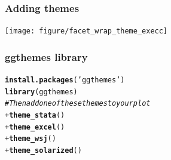 \documentclass{beamer}\usepackage[]{graphicx}\usepackage[]{color}
\makeatletter
\newcommand{\hlstr}[1]{\textcolor[rgb]{0.192,0.494,0.8}{#1}}%
\newcommand{\hlcom}[1]{\textcolor[rgb]{0.678,0.584,0.686}{\textit{#1}}}%
\newcommand{\hlopt}[1]{\textcolor[rgb]{0,0,0}{#1}}%
\newcommand{\hlstd}[1]{\textcolor[rgb]{0.345,0.345,0.345}{#1}}%
\newcommand{\hlkwd}[1]{\textcolor[rgb]{0.737,0.353,0.396}{\textbf{#1}}}%
\newenvironment{kframe}{%
 \def\at@end@of@kframe{}%
 \ifinner\ifhmode%
  \def\at@end@of@kframe{\end{minipage}}%
  \begin{minipage}{\columnwidth}%
 \fi\fi%
 \def\FrameCommand##1{\hskip\@totalleftmargin \hskip-\fboxsep
 \colorbox{shadecolor}{##1}\hskip-\fboxsep
     \hskip-\linewidth \hskip-\@totalleftmargin \hskip\columnwidth}%
 \MakeFramed {\advance\hsize-\width
   \@totalleftmargin\z@ \linewidth\hsize
   \@setminipage}}%
 {\par\unskip\endMakeFramed%
 \at@end@of@kframe}
\newenvironment{knitrout}{}{} %
\makeatother
\begin{document}

\begin{frame}[fragile]
\frametitle{Adding themes}
\begin{knitrout}\footnotesize
{}\color{fgcolor}
\texttt{[image: figure/facet\_wrap\_theme\_execc]} 

\end{knitrout}
\end{frame}


\begin{frame}[fragile]
\frametitle{ggthemes library}
\begin{knitrout}\footnotesize
{}\color{fgcolor}\begin{kframe}
\begin{alltt}
\hlkwd{install.packages}\hlstd{(}\hlstr{'ggthemes'}\hlstd{)}
\hlkwd{library}\hlstd{(ggthemes)}
\hlcom{# Then add one of these themes to your plot}
 \hlopt{+} \hlkwd{theme_stata}\hlstd{()}
 \hlopt{+} \hlkwd{theme_excel}\hlstd{()}
 \hlopt{+} \hlkwd{theme_wsj}\hlstd{()}
 \hlopt{+} \hlkwd{theme_solarized}\hlstd{()}
\end{alltt}
\end{kframe}
\end{knitrout}
\end{frame}

\end{document}
